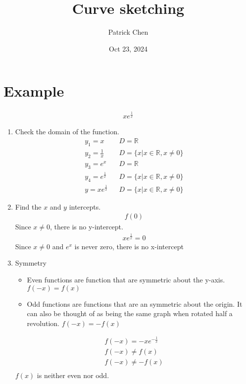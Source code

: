 \documentclass{article}
\title{Curve sketching}
\author{Patrick Chen}
\date{Oct 23, 2024}
\theoremstyle{mytheoremstyle}
\theoremstyle{mytheoremstyle}
\theoremstyle{myproblemstyle}
\begin{document}
    \maketitle
    \section*{Example}
    \begin{align*}
        xe^{\frac{1}{x}}
    \end{align*}
    \begin{enumerate}
        \item Check the domain of the function.
            \begin{align*}
                y_1=x && D=\mathbb{R} \\
                y_2= \frac{1}{x} && D=\{x|x\in \mathbb{R}, x\ne 0\} \\
                y_3= e^x && D=\mathbb{R} \\
                y_4= e^{\frac{1}{x}} && D=\{x|x\in\mathbb{R}, x\ne 0\} \\
                y  = xe^{\frac{1}{x}} && D=\{x|x\in\mathbb{R}, x\ne 0\}
            \end{align*}

        \item Find the $x$ and $y$ intercepts.
            \begin{align*}
                f(0)
            \end{align*}
            Since $x\ne 0$, there is no y-intercept.
            \begin{align*}
                xe^{\frac{1}{x}} = 0
            \end{align*}
            Since $x\ne 0$ and $e^x$ is never zero, there is no x-intercept

        \item Symmetry
            \begin{itemize}
                \item Even functions are function that are symmetric about the
                    y-axis. $f(-x)=f(x)$

                \item Odd functions are functions that are an symmetric about
                    the origin. It can also be thought of as being the same
                    graph when rotated half a revolution.
                    $f(-x)=-f(x)$
            \end{itemize}

            \begin{align*}
                f(-x) = -xe^{-\frac{1}{x}} \\
                f(-x) \ne f(x) \\
                f(-x) \ne -f(x) \\
            \end{align*}
            $f(x)$ is neither even nor odd.


\end{enumerate}
\end{document}
